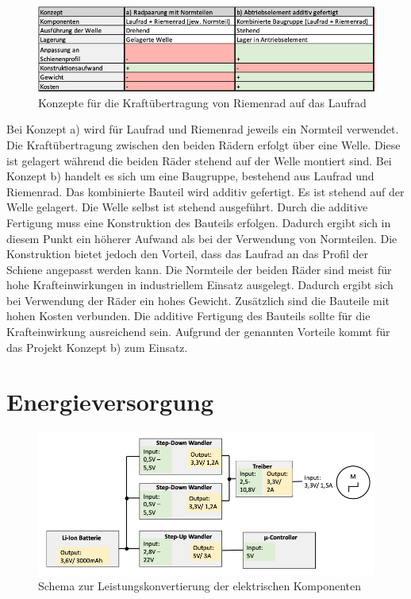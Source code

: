 \begin{figure}[h]
	\begin{center}
		\includegraphics[width=17cm]{abtriebkonzepte.png}
		\caption{Konzepte für die Kraftübertragung von Riemenrad auf das Laufrad}
		\label{pic:abtriebkonzepte}
	\end{center}
\end{figure}
\newpage
Bei Konzept a) wird für  Laufrad und Riemenrad jeweils ein Normteil verwendet. Die Kraftübertragung zwischen den beiden Rädern erfolgt über eine Welle. Diese ist gelagert während die beiden Räder stehend auf der Welle montiert sind.
Bei Konzept b) handelt es sich um eine Baugruppe, bestehend aus Laufrad und Riemenrad. Das kombinierte Bauteil wird additiv gefertigt. Es ist stehend auf der Welle gelagert.  Die Welle selbst ist stehend ausgeführt. 
Durch die additive Fertigung muss eine Konstruktion des Bauteils erfolgen. Dadurch ergibt sich in diesem Punkt ein höherer Aufwand als bei der Verwendung von Normteilen. Die Konstruktion bietet jedoch den Vorteil, dass das Laufrad an das Profil der Schiene angepasst werden kann. Die Normteile der beiden Räder sind meist für hohe Krafteinwirkungen in industriellem Einsatz ausgelegt. Dadurch ergibt sich bei Verwendung der Räder ein hohes Gewicht. Zusätzlich sind die Bauteile mit hohen Kosten verbunden. Die additive Fertigung des Bauteils sollte für die Krafteinwirkung ausreichend sein. Aufgrund der genannten Vorteile kommt für das Projekt Konzept b) zum Einsatz.  


\section{Energieversorgung}
\begin{figure}[h]
	\begin{center}
		\includegraphics[width=17cm]{leistungskonvertierung.png}
		\caption{Schema zur Leistungskonvertierung der elektrischen Komponenten}
		\label{pic:leistungskonvertierung}
	\end{center}
\end{figure}

